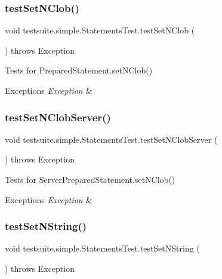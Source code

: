 \subsubsection{\texorpdfstring{test\+Set\+N\+Clob()}{testSetNClob()}}
{\footnotesize\ttfamily void testsuite.\+simple.\+Statements\+Test.\+test\+Set\+N\+Clob (\begin{DoxyParamCaption}{ }\end{DoxyParamCaption}) throws Exception}

Tests for Prepared\+Statement.\+set\+N\+Clob()


\begin{DoxyExceptions}{Exceptions}
{\em Exception} & \\
\hline
\end{DoxyExceptions}
\mbox{\label{classtestsuite_1_1simple_1_1_statements_test_a92f5e47200bc8ffaad2c183619802e81}} 
\subsubsection{\texorpdfstring{test\+Set\+N\+Clob\+Server()}{testSetNClobServer()}}
{\footnotesize\ttfamily void testsuite.\+simple.\+Statements\+Test.\+test\+Set\+N\+Clob\+Server (\begin{DoxyParamCaption}{ }\end{DoxyParamCaption}) throws Exception}

Tests for Server\+Prepared\+Statement.\+set\+N\+Clob()


\begin{DoxyExceptions}{Exceptions}
{\em Exception} & \\
\hline
\end{DoxyExceptions}
\mbox{\label{classtestsuite_1_1simple_1_1_statements_test_ad9dac6567ad8cfd19cc81d908c2d143b}} 
\subsubsection{\texorpdfstring{test\+Set\+N\+String()}{testSetNString()}}
{\footnotesize\ttfamily void testsuite.\+simple.\+Statements\+Test.\+test\+Set\+N\+String (\begin{DoxyParamCaption}{ }\end{DoxyParamCaption}) throws Exception}

